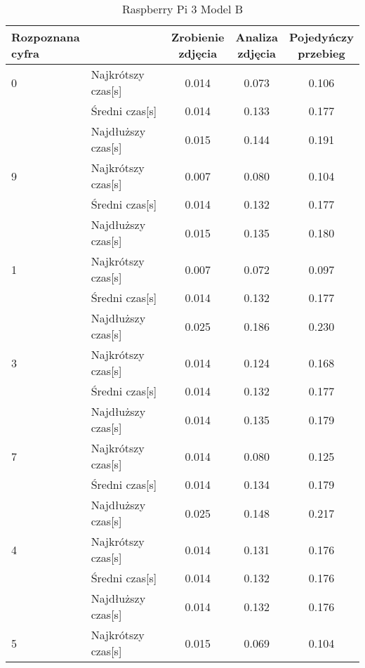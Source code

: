 \begin{table}[H]
    \centering
    \begin{threeparttable}
        \caption{Raspberry Pi 3 Model B}
        \begin{tabular}{|l|l|ccc|}
            \toprule
            \thead{Rozpoznana \\ cyfra} & & \thead{Zrobienie \\ zdjęcia} &
            \thead{Analiza \\ zdjęcia} & \thead{Pojedyńczy \\ przebieg} \\
            \midrule
            0 & Najkrótszy czas[s] & 0.014 & 0.073 & 0.106 \\
            & Średni czas[s] & 0.014 & 0.133 & 0.177 \\
            & Najdłuższy czas[s] & 0.015 & 0.144 & 0.191 \\
            \midrule
            9 & Najkrótszy czas[s] & 0.007 & 0.080 & 0.104 \\
            & Średni czas[s] & 0.014 & 0.132 & 0.177 \\
            & Najdłuższy czas[s] & 0.015 & 0.135 & 0.180 \\
            \midrule
            1 & Najkrótszy czas[s] & 0.007 & 0.072 & 0.097 \\
            & Średni czas[s] & 0.014 & 0.132 & 0.177 \\
            & Najdłuższy czas[s] & 0.025 & 0.186 & 0.230 \\
            \midrule
            3 & Najkrótszy czas[s] & 0.014 & 0.124 & 0.168 \\
            & Średni czas[s] & 0.014 & 0.132 & 0.177 \\
            & Najdłuższy czas[s] & 0.014 & 0.135 & 0.179 \\
            \midrule
            7 & Najkrótszy czas[s] & 0.014 & 0.080 & 0.125 \\
            & Średni czas[s] & 0.014 & 0.134 & 0.179 \\
            & Najdłuższy czas[s] & 0.025 & 0.148 & 0.217 \\
            \midrule
            4 & Najkrótszy czas[s] & 0.014 & 0.131 & 0.176 \\
            & Średni czas[s] & 0.014 & 0.132 & 0.176 \\
            & Najdłuższy czas[s] & 0.014 & 0.132 & 0.176 \\
            \midrule
            5 & Najkrótszy czas[s] & 0.015 & 0.069 & 0.104 \\

\end{tabular}
\end{threeparttable}
\end{table}
